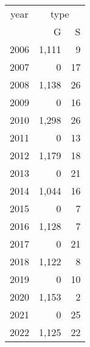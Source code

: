 \footnotesize\begin{tabular}[t]{lrr}
\toprule
\multicolumn{1}{c}{year} & \multicolumn{2}{c}{type} \\
\cmidrule(l{3pt}r{3pt}){1-1} \cmidrule(l{3pt}r{3pt}){2-3}
  & G & S\\
\midrule
2006 & 1,111 & 9\\
2007 & 0 & 17\\
2008 & 1,138 & 26\\
2009 & 0 & 16\\
2010 & 1,298 & 26\\
2011 & 0 & 13\\
2012 & 1,179 & 18\\
2013 & 0 & 21\\
2014 & 1,044 & 16\\
2015 & 0 & 7\\
2016 & 1,128 & 7\\
2017 & 0 & 21\\
2018 & 1,122 & 8\\
2019 & 0 & 10\\
2020 & 1,153 & 2\\
2021 & 0 & 25\\
2022 & 1,125 & 22\\
\bottomrule
\end{tabular}
